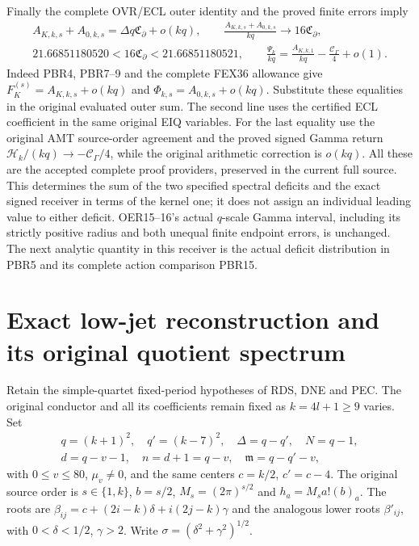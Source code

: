 \documentclass[11pt,a4paper]{article}
\begin{document}
Finally the complete OVR/ECL outer identity and the proved
finite errors imply
\[
\begin{gathered}
 A_{K,k,s}+A_{0,k,s}=\Delta q\mathfrak C_\partial+o(kq),\qquad
 \frac{A_{K,k,s}+A_{0,k,s}}{kq}\longrightarrow16\mathfrak C_\partial,\\
 21.66851180520<16\mathfrak C_\partial<21.66851180521,\qquad
 \frac{\Psi_k}{kq}
   =\frac{A_{K,k,1}}{kq}-\frac{\mathcal C_\Gamma}{4}+o(1).
\end{gathered}\tag{PBR19}
\]
Indeed PBR4, PBR7--9 and the complete FEX36 allowance give
$F_K^{(s)}=A_{K,k,s}+o(kq)$ and
$\Phi_{k,s}=A_{0,k,s}+o(kq)$.
Substitute these equalities in the original evaluated outer sum.
The second line uses the certified ECL coefficient in the same
original EIQ variables. For the last equality use the original
AMT source-order agreement and the proved signed Gamma return
$\mathcal H_k/(kq)\to-\mathcal C_\Gamma/4$, while the original
arithmetic correction is $o(kq)$. All these are the accepted
complete proof providers, preserved in the current full source.
This determines the sum of the two specified spectral deficits
and the exact signed receiver in terms of the kernel one; it
does not assign an individual leading value to either deficit.
OER15--16's actual $q$-scale Gamma interval, including its
strictly positive radius and both unequal finite endpoint
errors, is unchanged. The next analytic quantity in this
receiver is the actual deficit distribution in PBR5 and its
complete action comparison PBR15.

\clearpage
\section{Exact low-jet reconstruction and its original quotient spectrum}
\label{sec:LJR}

Retain the simple-quartet fixed-period hypotheses of RDS, DNE and PEC.
The original conductor and all its coefficients remain fixed as
$k=4l+1\ge9$ varies. Set
\[
 \begin{gathered}
 q=(k+1)^2,\quad q'=(k-7)^2,\quad \Delta=q-q',\quad N=q-1,\\
 d=q-v-1,\quad n=d+1=q-v,\quad \mathfrak m=q-q'-v,
 \end{gathered}
 \tag{LJR1}
\]
with $0\le v\le80$, $\mu_v\ne0$, and the same centers $c=k/2$,
$c'=c-4$. The original source order is $s\in\{1,k\}$,
$b=s/2$, $M_s=(2\pi)^{s/2}$ and $h_a=M_sa!(b)_a$.
The roots are
$\beta_{ij}=c+(2i-k)\delta+i(2j-k)\gamma$ and the analogous
lower roots $\beta'_{ij}$, with $0<\delta<1/2$, $\gamma>2$.
Write $\sigma=(\delta^2+\gamma^2)^{1/2}$.
\end{document}
